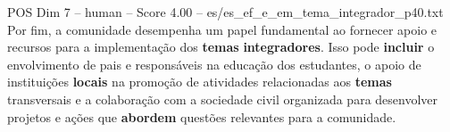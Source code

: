 \begin{textsample}{POS Dim 7 – human – Score 4.00 – es/es\_ef\_e\_em\_tema\_integrador\_p40.txt}  \label{ex:f7_pos_006}
Por fim, a comunidade desempenha um papel fundamental ao fornecer apoio e recursos para a implementação dos \textbf{temas} \textbf{integradores}.
Isso pode \textbf{incluir} o envolvimento de pais e responsáveis na educação dos estudantes, o apoio de instituições \textbf{locais} na promoção de atividades relacionadas aos \textbf{temas} transversais e a colaboração com a sociedade civil organizada para desenvolver projetos e ações que \textbf{abordem} questões relevantes para a comunidade.

\end{textsample}
